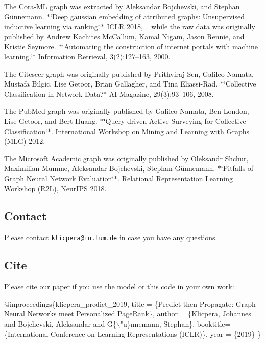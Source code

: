 The Cora-\/\+ML graph was extracted by Aleksandar Bojchevski, and Stephan Günnemann. $\ast$\char`\"{}\+Deep gaussian embedding of attributed graphs\+: Unsupervised inductive learning via ranking.\char`\"{}$\ast$ I\+C\+LR 2018, ~\newline
while the raw data was originally published by Andrew Kachites Mc\+Callum, Kamal Nigam, Jason Rennie, and Kristie Seymore. $\ast$\char`\"{}\+Automating the construction of internet portals with machine learning.\char`\"{}$\ast$ Information Retrieval, 3(2)\+:127–163, 2000.

The Citeseer graph was originally published by Prithviraj Sen, Galileo Namata, Mustafa Bilgic, Lise Getoor, Brian Gallagher, and Tina Eliassi-\/\+Rad. $\ast$\char`\"{}\+Collective Classification in Network Data.\char`\"{}$\ast$ AI Magazine, 29(3)\+:93–106, 2008.

The Pub\+Med graph was originally published by Galileo Namata, Ben London, Lise Getoor, and Bert Huang. $\ast$\char`\"{}\+Query-\/driven Active Surveying for Collective Classification\char`\"{}$\ast$. International Workshop on Mining and Learning with Graphs (M\+LG) 2012.

The Microsoft Academic graph was originally published by Oleksandr Shchur, Maximilian Mumme, Aleksandar Bojchevski, Stephan Günnemann. $\ast$\char`\"{}\+Pitfalls of Graph Neural Network Evaluation\char`\"{}$\ast$. Relational Representation Learning Workshop (R2L), Neur\+I\+PS 2018.

\subsection*{Contact}

Please contact \href{mailto:klicpera@in.tum.de}{\tt klicpera@in.\+tum.\+de} in case you have any questions.

\subsection*{Cite}

Please cite our paper if you use the model or this code in your own work\+:


\begin{DoxyCode}
@inproceedings\{klicpera\_predict\_2019,
    title = \{Predict then Propagate: Graph Neural Networks meet Personalized PageRank\},
    author = \{Klicpera, Johannes and Bojchevski, Aleksandar and G\{\(\backslash\)"u\}nnemann, Stephan\},
    booktitle=\{International Conference on Learning Representations (ICLR)\},
    year = \{2019\}
\}
\end{DoxyCode}
 